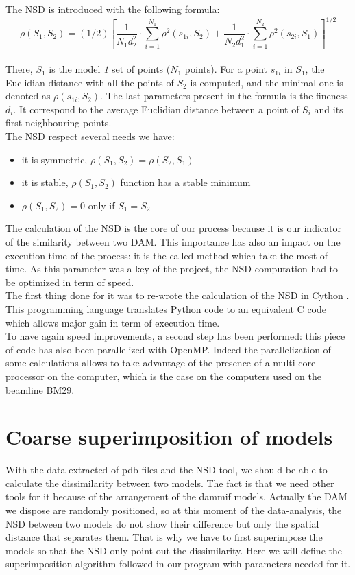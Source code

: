 \documentclass[a4paper, 11pt]{report}
\begin{document}
The NSD is introduced with the following formula:\\
\[
\rho(S_{1},S_{2})={(1/2)[\frac{1}{N_{1}d_{2}^2} \cdot \sum\limits_{i=1}^{N_{1}} \rho^2(s_{1i}, S_{2}) + \frac{1}{N_{2}d_{1}^2} \cdot \sum\limits_{i=1}^{N_{2}} \rho^2(s_{2i}, S_{1})]}^{1/2}
\]
\\
There, $S_{1}$ is the model \textit{1} set of points ($N_{1}$ points). 
For a point $s_{1i}$ in $S_{1}$, the Euclidian distance with all the 
points of $S_{2}$ is computed, and the minimal one is denoted as 
$\rho(s_{1i}, S_{2})$. 
The last parameters present in the formula is the fineness $d_{i}$. 
It correspond to the average Euclidian distance between a point of 
$S_{i}$ and its first neighbouring points.\\
The NSD respect several needs we have:
\begin{itemize}
 \item it is symmetric, $\rho(S_{1},S_{2}) = \rho(S_{2},S_{1})$
 \item it is stable, $\rho(S_{1},S_{2})$ function has a stable minimum
 \item $\rho(S_{1},S_{2}) = 0$ only if $S_{1} = S_{2}$
\end{itemize}

The calculation of the NSD is the core of our process because it is 
our indicator of the similarity between two DAM. 
This importance has also an impact on the execution time of the 
process: it is the called method which take the most of time. 
As this parameter was a key of the project, the NSD computation had to 
be optimized in term of speed.\\
The first thing done for it was to re-wrote the calculation of the NSD 
in Cython \cite{cython}. 
This programming language translates Python code to an equivalent C 
code which allows major gain in term of execution time.\\
To have again speed improvements, a second step has been performed: 
this piece of code has also been parallelized with OpenMP. 
Indeed the parallelization of some calculations allows to take 
advantage of the presence of a multi-core processor on the computer, 
which is the case on the computers used on the beamline BM29.

\section{Coarse superimposition of models}

With the data extracted of pdb files and the NSD tool, we should be 
able to calculate the dissimilarity between two models. 
The fact is that we need other tools for it because of the arrangement 
of the dammif models. 
Actually the DAM we dispose are randomly positioned, so at this moment 
of the data-analysis, the NSD between two models do not show their 
difference but only the spatial distance that separates them. 
That is why we have to first superimpose the models so that the NSD 
only point out the dissimilarity. 
Here we will define the superimposition algorithm followed in our 
program with parameters needed for it.\\
\end{document}
